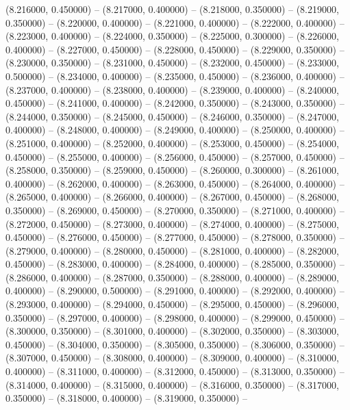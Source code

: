 (8.216000, 0.450000) -- 
(8.217000, 0.400000) -- 
(8.218000, 0.350000) -- 
(8.219000, 0.350000) -- 
(8.220000, 0.400000) -- 
(8.221000, 0.400000) -- 
(8.222000, 0.400000) -- 
(8.223000, 0.400000) -- 
(8.224000, 0.350000) -- 
(8.225000, 0.300000) -- 
(8.226000, 0.400000) -- 
(8.227000, 0.450000) -- 
(8.228000, 0.450000) -- 
(8.229000, 0.350000) -- 
(8.230000, 0.350000) -- 
(8.231000, 0.450000) -- 
(8.232000, 0.450000) -- 
(8.233000, 0.500000) -- 
(8.234000, 0.400000) -- 
(8.235000, 0.450000) -- 
(8.236000, 0.400000) -- 
(8.237000, 0.400000) -- 
(8.238000, 0.400000) -- 
(8.239000, 0.400000) -- 
(8.240000, 0.450000) -- 
(8.241000, 0.400000) -- 
(8.242000, 0.350000) -- 
(8.243000, 0.350000) -- 
(8.244000, 0.350000) -- 
(8.245000, 0.450000) -- 
(8.246000, 0.350000) -- 
(8.247000, 0.400000) -- 
(8.248000, 0.400000) -- 
(8.249000, 0.400000) -- 
(8.250000, 0.400000) -- 
(8.251000, 0.400000) -- 
(8.252000, 0.400000) -- 
(8.253000, 0.450000) -- 
(8.254000, 0.450000) -- 
(8.255000, 0.400000) -- 
(8.256000, 0.450000) -- 
(8.257000, 0.450000) -- 
(8.258000, 0.350000) -- 
(8.259000, 0.450000) -- 
(8.260000, 0.300000) -- 
(8.261000, 0.400000) -- 
(8.262000, 0.400000) -- 
(8.263000, 0.450000) -- 
(8.264000, 0.400000) -- 
(8.265000, 0.400000) -- 
(8.266000, 0.400000) -- 
(8.267000, 0.450000) -- 
(8.268000, 0.350000) -- 
(8.269000, 0.450000) -- 
(8.270000, 0.350000) -- 
(8.271000, 0.400000) -- 
(8.272000, 0.450000) -- 
(8.273000, 0.400000) -- 
(8.274000, 0.400000) -- 
(8.275000, 0.450000) -- 
(8.276000, 0.450000) -- 
(8.277000, 0.450000) -- 
(8.278000, 0.350000) -- 
(8.279000, 0.400000) -- 
(8.280000, 0.450000) -- 
(8.281000, 0.400000) -- 
(8.282000, 0.450000) -- 
(8.283000, 0.400000) -- 
(8.284000, 0.400000) -- 
(8.285000, 0.350000) -- 
(8.286000, 0.400000) -- 
(8.287000, 0.350000) -- 
(8.288000, 0.400000) -- 
(8.289000, 0.400000) -- 
(8.290000, 0.500000) -- 
(8.291000, 0.400000) -- 
(8.292000, 0.400000) -- 
(8.293000, 0.400000) -- 
(8.294000, 0.450000) -- 
(8.295000, 0.450000) -- 
(8.296000, 0.350000) -- 
(8.297000, 0.400000) -- 
(8.298000, 0.400000) -- 
(8.299000, 0.450000) -- 
(8.300000, 0.350000) -- 
(8.301000, 0.400000) -- 
(8.302000, 0.350000) -- 
(8.303000, 0.450000) -- 
(8.304000, 0.350000) -- 
(8.305000, 0.350000) -- 
(8.306000, 0.350000) -- 
(8.307000, 0.450000) -- 
(8.308000, 0.400000) -- 
(8.309000, 0.400000) -- 
(8.310000, 0.400000) -- 
(8.311000, 0.400000) -- 
(8.312000, 0.450000) -- 
(8.313000, 0.350000) -- 
(8.314000, 0.400000) -- 
(8.315000, 0.400000) -- 
(8.316000, 0.350000) -- 
(8.317000, 0.350000) -- 
(8.318000, 0.400000) -- 
(8.319000, 0.350000) -- 
